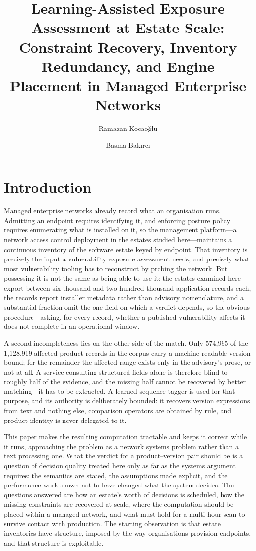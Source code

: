 \documentclass[fleqn,10pt,lineno]{wlpeerj}
\title{Learning-Assisted Exposure Assessment at Estate Scale: Constraint Recovery, Inventory Redundancy, and Engine Placement in Managed Enterprise Networks}
\author[1]{Ramazan Kocaoğlu}
\author[1]{Basma Bakırcı}
\affil[1]{Department of Computer Engineering, Ostim Technical University, Ankara, Turkey}
\makeatletter
\newcommand{\printkeywords}{\ifdefined\@pjkw
  \par\smallskip\noindent{\color{color1}\sffamily\bfseries Keywords:\ }\@pjkw\par\medskip\fi}
\makeatother
\begin{document}
\raggedbottom
\maketitle
\thispagestyle{empty}
\printkeywords

\section{Introduction}
\label{sec:intro}

Managed enterprise networks already record what an organisation runs. Admitting an endpoint requires identifying it, and enforcing posture policy requires enumerating what is installed on it, so the management platform---a network access control deployment in the estates studied here---maintains a continuous inventory of the software estate keyed by endpoint. That inventory is precisely the input a vulnerability exposure assessment needs, and precisely what most vulnerability tooling has to reconstruct by probing the network. But possessing it is not the same as being able to use it: the estates examined here export between six thousand and two hundred thousand application records each, the records report installer metadata rather than advisory nomenclature, and a substantial fraction omit the one field on which a verdict depends, so the obvious procedure---asking, for every record, whether a published vulnerability affects it---does not complete in an operational window.

A second incompleteness lies on the other side of the match. Only 574,995 of the 1,128,919 affected-product records in the corpus carry a machine-readable version bound; for the remainder the affected range exists only in the advisory's prose, or not at all. A service consulting structured fields alone is therefore blind to roughly half of the evidence, and the missing half cannot be recovered by better matching---it has to be extracted. A learned sequence tagger is used for that purpose, and its authority is deliberately bounded: it recovers version expressions from text and nothing else, comparison operators are obtained by rule, and product identity is never delegated to it.

This paper makes the resulting computation tractable and keeps it correct while it runs, approaching the problem as a network systems problem rather than a text processing one. What the verdict for a product--version pair should be is a question of decision quality treated here only as far as the systems argument requires: the semantics are stated, the assumptions made explicit, and the performance work shown not to have changed what the system decides. The questions answered are how an estate's worth of decisions is scheduled, how the missing constraints are recovered at scale, where the computation should be placed within a managed network, and what must hold for a multi-hour scan to survive contact with production. The starting observation is that estate inventories have structure, imposed by the way organisations provision endpoints, and that structure is exploitable.
\end{document}
